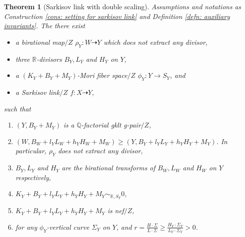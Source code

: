 \documentclass[11pt]{amsart}
\numberwithin{equation}{section}
\newcommand{\Qq}{\mathbb{Q}}
\newcommand{\Rr}{\mathbb{R}}
\newtheorem{thm}{Theorem}[section]
\theoremstyle{definition}
\theoremstyle{definition}
\theoremstyle{definition}
\begin{document}
\begin{thm}[Sarkisov link with double scaling]\label{thm: scaling sarkisov}
Assumptions and notations as Construction \ref{cons: setting for sarkisov link} and Definition \ref{defn: auxiliary invariants}. The there exist
\begin{itemize}
    \item a birational map$/Z$ $\rho_Y: W\dashrightarrow Y$ which does not extract any divisor,
    \item three $\Rr$-divisors $B_Y,L_Y$ and $H_Y$ on $Y$,
    \item a $(K_Y+B_Y+M_Y)$-Mori fiber space$/Z$ $\phi_Y:Y\rightarrow S_Y$, and
    \item a Sarkisov link$/Z$ $f: X\dashrightarrow Y$,
\end{itemize}
such that
\begin{enumerate}
\item $(Y,B_Y+M_Y)$ is a $\Qq$-factorial gklt g-pair$/Z$,
    \item $(W,B_W+l_YL_W+h_YH_W+M_W)\geq (Y,B_Y+l_YL_Y+h_YH_Y+M_Y)$. In particular, $\rho_Y$ does not extract any divisor,
    \item $B_Y,L_Y$ and $H_Y$ are the birational transforms of $B_W,L_W$ and $H_W$ on $Y$ respectively,
    \item $K_Y+B_Y+l_YL_Y+h_YH_Y+M_Y\sim_{\Rr,S_Y}0$, 
    \item $K_Y+B_Y+l_YL_Y+h_YH_Y+M_Y$ is nef$/Z$, 
    \item for any $\phi_Y$-vertical curve $\Sigma_Y$ on $Y$, and $r=\frac{H\cdot\Sigma}{L\cdot\Sigma}\geq\frac{H_Y\cdot\Sigma_Y}{L_Y\cdot\Sigma_Y}>0$.
\end{enumerate}
\end{thm}
\end{document}
